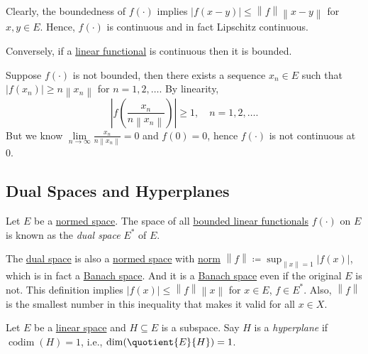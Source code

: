 Clearly, the boundedness of \(f(\cdot)\) implies \(\left\vert f(x-y) \right\vert \leq \left\lVert f\right\rVert \left\lVert x-y\right\rVert \) for \(x, y\in E\). Hence, \(f(\cdot)\) is continuous and in fact Lipschitz continuous.

\begin{remark}
	Conversely, if a \hyperref[def:linear-functional]{linear functional} is continuous then it is bounded.
\end{remark}
\begin{explanation}
	Suppose \(f(\cdot)\) is not bounded, then there exists a sequence \(x_n\in E\) such that \(\left\vert f(x_n) \right\vert \geq n \left\lVert x_n\right\rVert \) for \(n = 1, 2, \ldots  \). By linearity,
	\[
		\left\vert f \left( \frac{x_{n} }{n \left\lVert x_{n} \right\rVert } \right) \right\vert \geq 1, \quad n = 1, 2, \ldots.
	\]
	But we know \(\lim\limits_{n \to \infty} \frac{x_{n} }{n \left\lVert x_{n} \right\rVert }=0\) and \(f(0) = 0\), hence \(f(\cdot)\) is not continuous at \(0\).
\end{explanation}

\subsection{Dual Spaces and Hyperplanes}
\begin{definition}\label{def:dual-space}
	Let \(E\) be a \hyperref[def:normed-vector-space]{normed space}. The space of all \hyperref[def:bounded-linear-functional]{bounded linear functionals} \(f(\cdot)\) on \(E\) is known as the \emph{dual space} \(E^{\ast} \) of \(E\).
\end{definition}
The \hyperref[def:dual-space]{dual space} is also a \hyperref[def:normed-vector-space]{normed space} with \hyperref[def:norm]{norm} \(\left\lVert f\right\rVert \coloneqq \sup _{\left\lVert x\right\rVert = 1}\left\vert f(x) \right\vert \), which is in fact a \hyperref[def:Banach-space]{Banach space}. And it is a \hyperref[def:Banach-space]{Banach space} even if the original \(E\) is not. This definition implies \(\left\vert f(x) \right\vert \leq \left\lVert f\right\rVert \left\lVert x\right\rVert \) for \(x\in E\), \(f\in E^{\ast} \). Also, \(\left\lVert f\right\rVert \) is the smallest number in this inequality that makes it valid for all \(x\in X\).

\begin{definition}[Hyperplane]\label{def:hyperplane}
	Let \(E\) be a \hyperref[def:linear-vector-space]{linear space} and \(H\subseteq E\) is a subspace. Say \(H\) is a \emph{hyperplane} if \(\mathop{\mathrm{codim}}(H)=1\), i.e., \(\dim (\quotient{E}{H})=1\).
\end{definition}

